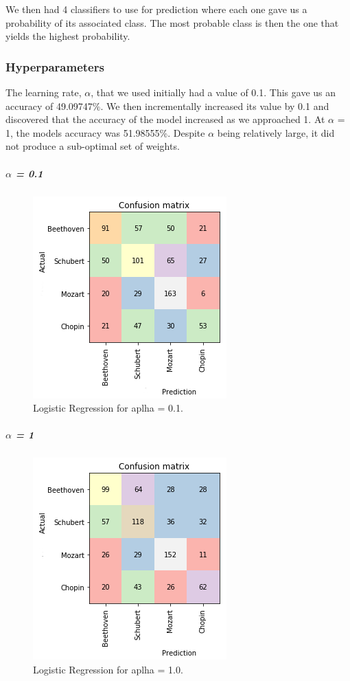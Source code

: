 \documentclass[11pt]{article}
\makeatletter
\def\maxwidth{\ifdim\Gin@nat@width>\linewidth\linewidth
    \else\Gin@nat@width\fi}
\let\Oldincludegraphics\includegraphics
\renewcommand{\includegraphics}[1]{\Oldincludegraphics[width=.8\maxwidth]{#1}}
\makeatother
\begin{document}
We then had 4 classifiers to use for prediction where each one gave us a
probability of its associated class. The most probable class is then the
one that yields the highest probability.

\subsubsection{Hyperparameters}\label{hyperparameters}

The learning rate, \(\alpha\), that we used initially had a value of
0.1. This gave us an accuracy of 49.09747\%. We then incrementally
increased its value by 0.1 and discovered that the accuracy of the model
increased as we approached 1. At \(\alpha\) = 1, the models accuracy was
51.98555\%. Despite \(\alpha\) being relatively large, it did not
produce a sub-optimal set of weights.

\subparagraph{\texorpdfstring{\(\alpha\) =
0.1}{\textbackslash{}alpha = 0.1}}\label{alpha-0.1}

\begin{figure}[htbp]
\centering
\includegraphics{report/plots/LRalpha1.png}
\caption{Logistic Regression for aplha = 0.1.}
\end{figure}

\subparagraph{\texorpdfstring{\(\alpha\) =
1}{\textbackslash{}alpha = 1}}\label{alpha-1}

\begin{figure}[htbp]
\centering
\includegraphics{report/plots/LRalpha2.png}
\caption{Logistic Regression for aplha = 1.0.}
\end{figure}
\end{document}

